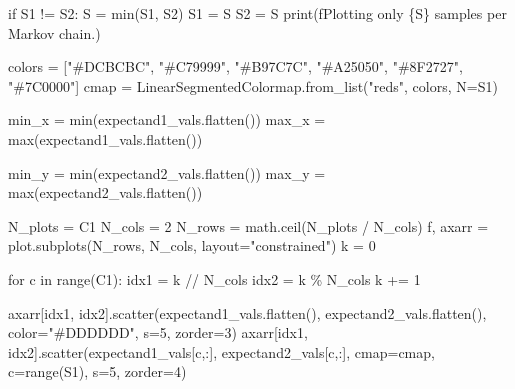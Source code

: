 \documentclass[
  letterpaper,
  DIV=11,
  numbers=noendperiod]{scrartcl}
\newenvironment{Shaded}{\begin{snugshade}}{\end{snugshade}}
\newcommand{\BuiltInTok}[1]{\textcolor[rgb]{0.00,0.23,0.31}{#1}}
\newcommand{\ControlFlowTok}[1]{\textcolor[rgb]{0.00,0.23,0.31}{#1}}
\newcommand{\DecValTok}[1]{\textcolor[rgb]{0.68,0.00,0.00}{#1}}
\newcommand{\KeywordTok}[1]{\textcolor[rgb]{0.00,0.23,0.31}{#1}}
\newcommand{\NormalTok}[1]{\textcolor[rgb]{0.00,0.23,0.31}{#1}}
\newcommand{\OperatorTok}[1]{\textcolor[rgb]{0.37,0.37,0.37}{#1}}
\newcommand{\SpecialCharTok}[1]{\textcolor[rgb]{0.37,0.37,0.37}{#1}}
\newcommand{\SpecialStringTok}[1]{\textcolor[rgb]{0.13,0.47,0.30}{#1}}
\newcommand{\StringTok}[1]{\textcolor[rgb]{0.13,0.47,0.30}{#1}}
\begin{document}
\begin{Shaded}
\begin{Highlighting}[]
  \ControlFlowTok{if}\NormalTok{ S1 }\OperatorTok{!=}\NormalTok{ S2:}
\NormalTok{    S }\OperatorTok{=} \BuiltInTok{min}\NormalTok{(S1, S2)}
\NormalTok{    S1 }\OperatorTok{=}\NormalTok{ S}
\NormalTok{    S2 }\OperatorTok{=}\NormalTok{ S}
    \BuiltInTok{print}\NormalTok{(}\SpecialStringTok{f\textquotesingle{}Plotting only }\SpecialCharTok{\{}\NormalTok{S}\SpecialCharTok{\}}\SpecialStringTok{ samples per Markov chain.\textquotesingle{}}\NormalTok{)}

\NormalTok{  colors }\OperatorTok{=}\NormalTok{ [}\StringTok{"\#DCBCBC"}\NormalTok{, }\StringTok{"\#C79999"}\NormalTok{, }\StringTok{"\#B97C7C"}\NormalTok{,}
            \StringTok{"\#A25050"}\NormalTok{, }\StringTok{"\#8F2727"}\NormalTok{, }\StringTok{"\#7C0000"}\NormalTok{]}
\NormalTok{  cmap }\OperatorTok{=}\NormalTok{ LinearSegmentedColormap.from\_list(}\StringTok{"reds"}\NormalTok{, colors, N}\OperatorTok{=}\NormalTok{S1)}

\NormalTok{  min\_x }\OperatorTok{=} \BuiltInTok{min}\NormalTok{(expectand1\_vals.flatten())}
\NormalTok{  max\_x }\OperatorTok{=} \BuiltInTok{max}\NormalTok{(expectand1\_vals.flatten())}

\NormalTok{  min\_y }\OperatorTok{=} \BuiltInTok{min}\NormalTok{(expectand2\_vals.flatten())}
\NormalTok{  max\_y }\OperatorTok{=} \BuiltInTok{max}\NormalTok{(expectand2\_vals.flatten())}

\NormalTok{  N\_plots }\OperatorTok{=}\NormalTok{ C1}
\NormalTok{  N\_cols }\OperatorTok{=} \DecValTok{2}
\NormalTok{  N\_rows }\OperatorTok{=}\NormalTok{ math.ceil(N\_plots }\OperatorTok{/}\NormalTok{ N\_cols)}
\NormalTok{  f, axarr }\OperatorTok{=}\NormalTok{ plot.subplots(N\_rows, N\_cols, layout}\OperatorTok{=}\StringTok{"constrained"}\NormalTok{)}
\NormalTok{  k }\OperatorTok{=} \DecValTok{0}

  \ControlFlowTok{for}\NormalTok{ c }\KeywordTok{in} \BuiltInTok{range}\NormalTok{(C1):}
\NormalTok{    idx1 }\OperatorTok{=}\NormalTok{ k }\OperatorTok{//}\NormalTok{ N\_cols}
\NormalTok{    idx2 }\OperatorTok{=}\NormalTok{ k }\OperatorTok{\%}\NormalTok{ N\_cols}
\NormalTok{    k }\OperatorTok{+=} \DecValTok{1}

\NormalTok{    axarr[idx1, idx2].scatter(expectand1\_vals.flatten(),}
\NormalTok{                              expectand2\_vals.flatten(),}
\NormalTok{                              color}\OperatorTok{=}\StringTok{"\#DDDDDD"}\NormalTok{, s}\OperatorTok{=}\DecValTok{5}\NormalTok{, zorder}\OperatorTok{=}\DecValTok{3}\NormalTok{)}
\NormalTok{    axarr[idx1, idx2].scatter(expectand1\_vals[c,:], expectand2\_vals[c,:],}
\NormalTok{                              cmap}\OperatorTok{=}\NormalTok{cmap, c}\OperatorTok{=}\BuiltInTok{range}\NormalTok{(S1), s}\OperatorTok{=}\DecValTok{5}\NormalTok{, zorder}\OperatorTok{=}\DecValTok{4}\NormalTok{)}


\end{Highlighting}
\end{Shaded}
\end{document}
